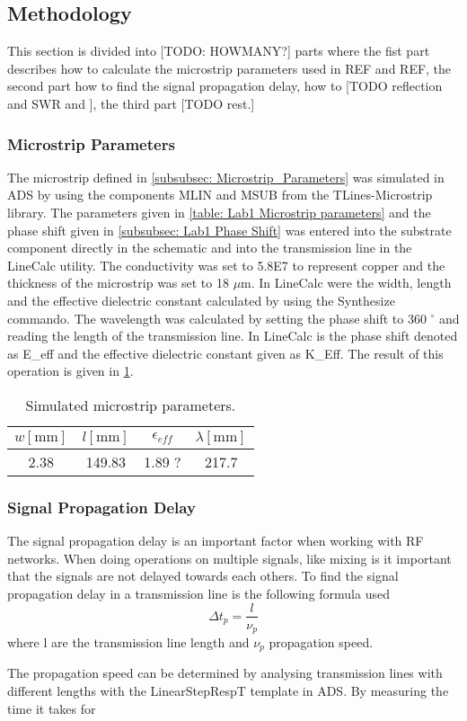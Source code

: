 \documentclass[report.tex]{subfiles}
\begin{document}
\subsection{Methodology}
This section is divided into [TODO: HOWMANY?] parts where the fist part describes how to calculate the microstrip parameters used in REF and REF, the second part how to find the signal propagation delay, how to [TODO reflection and SWR and ], the third part [TODO rest.]
\subsubsection{Microstrip Parameters}
The microstrip defined in \ref{subsubsec: Microstrip_Parameters} was simulated in ADS by using the components MLIN and MSUB from the TLines-Microstrip library. The parameters given in \ref{table: Lab1 Microstrip parameters} and the phase shift given in \ref{subsubsec: Lab1 Phase Shift} was entered into the substrate component directly in the schematic and into the transmission line in the LineCalc utility. The conductivity was set to 5.8E7 to represent copper and the thickness of the microstrip was set to 18 $\mu$m. In LineCalc were the width, length and the effective dielectric constant calculated by using the Synthesize commando. The wavelength was calculated by setting the phase shift to 360 $^\circ$ and reading the length of the transmission line. In LineCalc is the phase shift denoted as E\_eff and the effective dielectric constant given as K\_Eff. The result of this operation is given in \ref{table: Lab1 Simulated Microstrip parameters}.

\begin{table}[H]
    \centering
    \caption{Simulated microstrip parameters.}
    \begin{tabular}{c | c | c | c}
        $w [\text{mm}]$ & $l [\text{mm}]$ & $\epsilon_{eff}$ & $\lambda [\text{mm}]$\\
        \hline
		2.38 & 149.83 & 1.89 ? & 217.7
    \end{tabular}
    \label{table: Lab1 Simulated Microstrip parameters}
\end{table}

\subsubsection{Signal Propagation Delay}
The signal propagation delay is an important factor when working with RF networks. When doing operations on multiple signals, like mixing is it important that the signals are not delayed towards each others. To find the signal propagation delay in a transmission line is the following formula used
\begin{equation}
	\Delta t_p = \dfrac{l}{\nu_p}
\end{equation}
where l are the transmission line length and $\nu_p$ propagation speed.

The propagation speed can be determined by analysing transmission lines with different lengths with the LinearStepRespT template in ADS. By measuring the time it takes for
\end{document}
